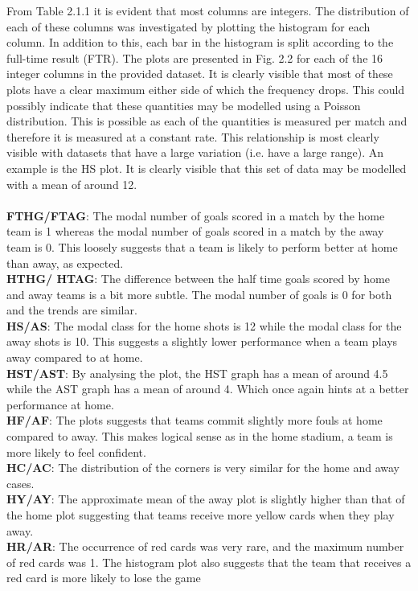 \documentclass[a4paper,12pt]{article}
\begin{document}
	From Table 2.1.1 it is evident that most columns are integers. The distribution of each of these columns was investigated by plotting the histogram for each column. In addition to this, each bar in the histogram is split according to the full-time result (FTR). The plots are presented in Fig. 2.2 for each of the 16 integer columns in the provided dataset. It is clearly visible that most of these plots have a clear maximum either side of which the frequency drops. This could possibly indicate that these quantities may be modelled using a Poisson distribution. This is possible as each of the quantities is measured per match and therefore it is measured at a constant rate. This relationship is most clearly visible with datasets that have a large variation (i.e. have a large range). An example is the HS plot. It is clearly visible that this set of data may be modelled with a mean of around 12.\\
	\\
	\textbf{FTHG/FTAG}: The modal number of goals scored in a match by the home team is 1 whereas the modal number of goals scored in a match by the away team is 0. This loosely suggests that a team is likely to perform better at home than away, as expected.\\
	\textbf{HTHG/ HTAG}: The difference between the half time goals scored by home and away teams is a bit more subtle. The modal number of goals is 0 for both and the trends are similar.\\
	\textbf{HS/AS}: The modal class for the home shots is 12 while the modal class for the away shots is 10. This suggests a slightly lower performance when a team plays away compared to at home.\\
	\textbf{HST/AST}: By analysing the plot, the HST graph has a mean of around 4.5 while the AST graph has a mean of around 4. Which once again hints at a better performance at home.\\
	\textbf{HF/AF}: The plots suggests that teams commit slightly more fouls at home compared to away. This makes logical sense as in the home stadium, a team is more likely to feel confident.\\
	\textbf{HC/AC}: The distribution of the corners is very similar for the home and away cases.\\
	\textbf{HY/AY}: The approximate mean of the away plot is slightly higher than that of the home plot suggesting that teams receive more yellow cards when they play away.\\
	\textbf{HR/AR}: The occurrence of red cards was very rare, and the maximum number of red cards was 1. The histogram plot also suggests that the team that receives a red card is more likely to lose the game
	
\end{document}

